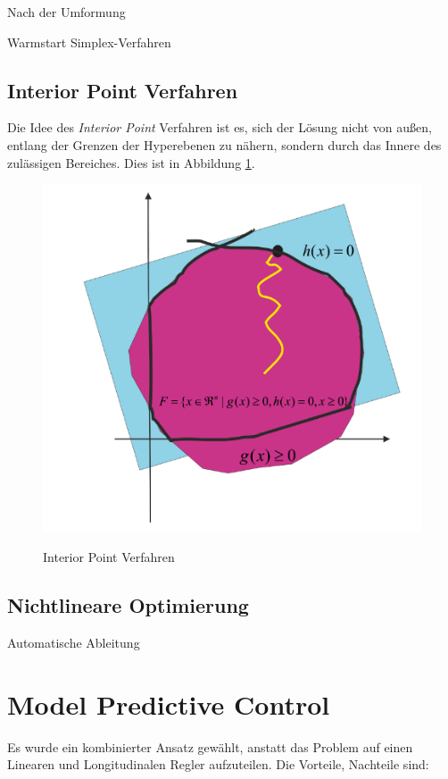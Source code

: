 \documentclass{like}
\begin{document}
 Nach der Umformung
 
 Warmstart
  Simplex-Verfahren
  
 \subsection*{Interior Point Verfahren}  
 Die Idee des \textit{Interior Point} Verfahren ist es, sich der Lösung nicht von außen, entlang der Grenzen der Hyperebenen zu nähern, sondern durch das Innere des zulässigen Bereiches. Dies ist in Abbildung \ref{fig:iterPoint}.
 
 \begin{figure}[ht!]
 	\caption{Interior Point Verfahren}
 	\includegraphics[width=350pt]{Abbildungen/iterPoint.png}
 	\label{fig:iterPoint}
 \end{figure}
 
 
 \subsection*{Nichtlineare Optimierung}
 

 
 Automatische Ableitung
 
 
 
 
\section{Model Predictive Control}
Es wurde ein kombinierter Ansatz gewählt, anstatt das Problem auf einen Linearen und Longitudinalen Regler aufzuteilen. Die Vorteile, Nachteile sind:
\end{document}
